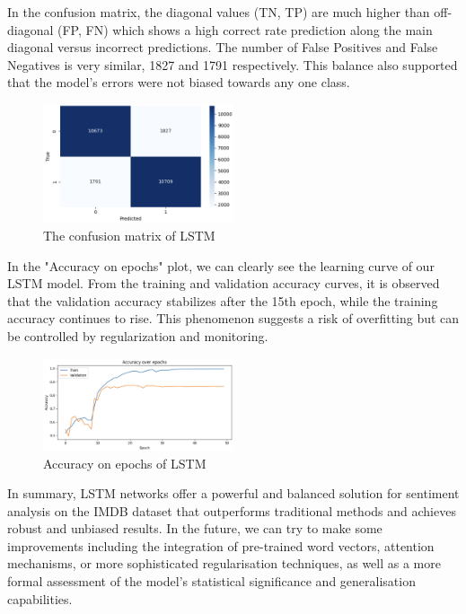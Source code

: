 In the confusion matrix, the diagonal values (TN, TP) are much higher than off-diagonal (FP, FN) which shows a high correct rate prediction along the main diagonal versus incorrect predictions. The number of False Positives and False Negatives is very similar, 1827 and 1791 respectively. This balance also supported that the model's errors were not biased towards any one class.

\begin{figure}[ht]
    \centering
    \includegraphics[width=0.5\textwidth]{pics/lstm_metrix.png}
    \caption{The confusion matrix of LSTM}
\end{figure}

In the "Accuracy on epochs" plot, we can clearly see the learning curve of our LSTM model.  From the training and validation accuracy curves, it is observed that the validation accuracy stabilizes after the 15th epoch, while the training accuracy continues to rise. This phenomenon suggests a risk of overfitting but can be controlled by regularization and monitoring.

\begin{figure}[ht]
    \centering
    \includegraphics[width=0.5\textwidth]{pics/lstm_accuracy_s.png}
    \caption{Accuracy on epochs of LSTM}
\end{figure}

In summary, LSTM networks offer a powerful and balanced solution for sentiment analysis on the IMDB dataset that outperforms traditional methods and achieves robust and unbiased results. In the future, we can try to make some improvements including the integration of pre-trained word vectors, attention mechanisms, or more sophisticated regularisation techniques, as well as a more formal assessment of the model's statistical significance and generalisation capabilities.





